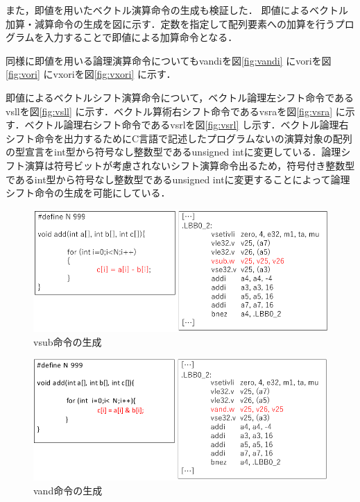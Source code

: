 また，即値を用いたベクトル演算命令の生成も検証した．
即値によるベクトル加算・減算命令の生成を図に示す．定数を指定して配列要素への加算を行うプログラムを入力することで即値による加算命令となる．

同様に即値を用いる論理演算命令についてもvandiを図\ref{fig:vandi}
にvoriを図\ref{fig:vori}
にvxoriを図\ref{fig:vxori}
に示す．

即値によるベクトルシフト演算命令について，ベクトル論理左シフト命令であるvsllを図\ref{fig:vsll}
に示す．ベクトル算術右シフト命令であるvsraを図\ref{fig:vsra}
に示す．ベクトル論理右シフト命令であるvsrlを図\ref{fig:vsrl}
し示す．ベクトル論理右シフト命令を出力するためにC言語で記述したプログラムないの演算対象の配列の型宣言をint型から符号なし整数型であるunsigned intに変更している．論理シフト演算は符号ビットが考慮されないシフト演算命令出るため，符号付き整数型であるint型から符号なし整数型であるunsigned intに変更することによって論理シフト命令の生成を可能にしている．

\begin{figure}
    \centering
    \includegraphics[scale=0.8]{image/vsub.pdf}
    \caption{vsub命令の生成}
    \label{fig:vsub}
\end{figure}

\begin{figure}
    \centering
    \includegraphics[scale=0.8]{image/vand.pdf}
    \caption{vand命令の生成}
    \label{fig:vand}
\end{figure}

